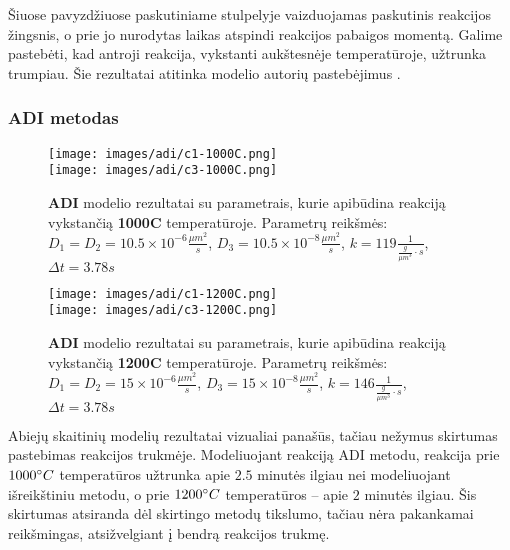 Šiuose pavyzdžiuose paskutiniame stulpelyje vaizduojamas paskutinis reakcijos žingsnis, o prie jo nurodytas laikas atspindi reakcijos pabaigos momentą. Galime pastebėti, kad antroji reakcija, vykstanti aukštesnėje temperatūroje, užtrunka trumpiau. Šie rezultatai atitinka modelio autorių pastebėjimus \cite{mackeviciusCloserLookComputer2012}.

\subsubsection{ADI metodas}

\begin{figure}[h!]
  \centering
  \texttt{[image: images/adi/c1-1000C.png]} \\ 
  \texttt{[image: images/adi/c3-1000C.png]}
  \caption{\textbf{ADI} modelio rezultatai su parametrais, kurie apibūdina reakciją vykstančią \textbf{1000\degree C} temperatūroje. Parametrų reikšmės: $D_1 = D_2 = 10.5\times 10^{-6} \frac{\mu m^2}{s}$, $D_3 = 10.5\times 10^{-8} \frac{\mu m^2}{s}$, $k = 119 \frac{1}{ \frac{g}{\mu m^3}\cdot s}$, $\Delta t = 3.78s$}
  \label{fig:adi-result-T-1000}
\end{figure}

\begin{figure}[h!]
  \centering
  \texttt{[image: images/adi/c1-1200C.png]} \\ 
  \texttt{[image: images/adi/c3-1200C.png]}
  \caption{\textbf{ADI} modelio rezultatai su parametrais, kurie apibūdina reakciją vykstančią \textbf{1200\degree C} temperatūroje. Parametrų reikšmės: $D_1 = D_2 = 15\times 10^{-6} \frac{\mu m^2}{s}$, $D_3 = 15\times 10^{-8} \frac{\mu m^2}{s}$, $k = 146 \frac{1}{ \frac{g}{\mu m^3}\cdot s}$, $\Delta t = 3.78s$}
  \label{fig:adi-result-T-1200}
\end{figure}

Abiejų skaitinių modelių rezultatai vizualiai panašūs, tačiau nežymus skirtumas pastebimas reakcijos trukmėje. Modeliuojant reakciją ADI metodu, reakcija prie $1000\degree C$ temperatūros užtrunka apie $2.5$ minutės ilgiau nei modeliuojant išreikštiniu metodu, o prie $1200\degree C$ temperatūros -- apie $2$ minutės ilgiau. Šis skirtumas atsiranda dėl skirtingo metodų tikslumo, tačiau nėra pakankamai reikšmingas, atsižvelgiant į bendrą reakcijos trukmę.
